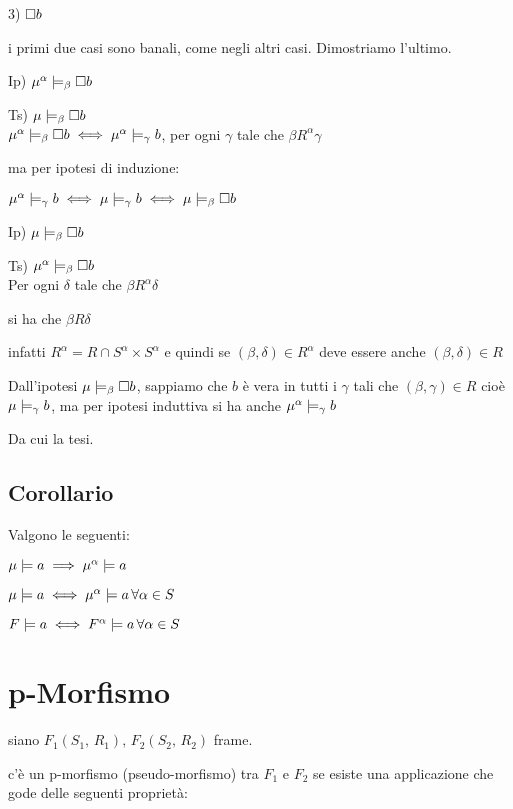 3) $\square b$

i primi due casi sono banali, come negli altri casi. Dimostriamo l'ultimo.

Ip) $\mu^{\alpha}\models_{\beta}\square b$ 

Ts) $\mu\models_{\beta}\square b$\\


$\mu^{\alpha}\models_{\beta}\square b\iff\mu^{\alpha}\models_{\gamma}b$,
per ogni $\gamma$ tale che $\beta R^{\alpha}\gamma$

ma per ipotesi di induzione:

$\mu^{\alpha}\models_{\gamma}b\iff\mu\models_{\gamma}b\iff\mu\models_{\beta}\square b$

Ip) $\mu\models_{\beta}\square b$

Ts) $\mu^{\alpha}\models_{\beta}\square b$\\


Per ogni $\delta$ tale che $\beta R^{\alpha}\delta$

si ha che $\beta R\delta$

infatti $R^{\alpha}=R\cap S^{\alpha}\times S^{\alpha}$ e quindi se
$(\beta,\delta)\in R^{\alpha}$ deve essere anche $(\beta,\delta)\in R$

Dall'ipotesi $\mu\models_{\beta}\square b$, sappiamo che $b$ è vera
in tutti i $\gamma$ tali che $(\beta,\gamma)\in R$ cioè $\mu\models_{\gamma}b$,
ma per ipotesi induttiva si ha anche $\mu^{\alpha}\models_{\gamma}b$

Da cui la tesi.


\subsection{Corollario}

Valgono le seguenti:

$\mu\models a\implies\mu^{\alpha}\models a$

$\mu\models a\iff\mu^{\alpha}\models a\,\forall\alpha\in S$

$F\models a\iff F^{\alpha}\models a\,\forall\alpha\in S$


\section{p-Morfismo}

siano $F_{1}(S_{1},\, R_{1}),\, F_{2}(S_{2},\, R_{2})$ frame.

c'è un p-morfismo (pseudo-morfismo) tra $F_{1}$ e $F_{2}$ se esiste
una applicazione che gode delle seguenti proprietà:

